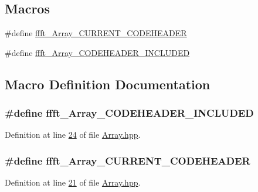 \subsection*{Macros}
\begin{DoxyCompactItemize}
\item 
\#define \hyperlink{a00084_a478c0a3d4e07d03940b1ced717db82e9}{ffft\+\_\+\+Array\+\_\+\+C\+U\+R\+R\+E\+N\+T\+\_\+\+C\+O\+D\+E\+H\+E\+A\+D\+E\+R}
\item 
\#define \hyperlink{a00084_a9c7eea905ae130cc9a5ee2a20ded5c21}{ffft\+\_\+\+Array\+\_\+\+C\+O\+D\+E\+H\+E\+A\+D\+E\+R\+\_\+\+I\+N\+C\+L\+U\+D\+E\+D}
\end{DoxyCompactItemize}


\subsection{Macro Definition Documentation}
\hypertarget{a00084_a9c7eea905ae130cc9a5ee2a20ded5c21}{
\subsubsection[{ffft\+\_\+\+Array\+\_\+\+C\+O\+D\+E\+H\+E\+A\+D\+E\+R\+\_\+\+I\+N\+C\+L\+U\+D\+E\+D}]{\setlength{\rightskip}{0pt plus 5cm}\#define ffft\+\_\+\+Array\+\_\+\+C\+O\+D\+E\+H\+E\+A\+D\+E\+R\+\_\+\+I\+N\+C\+L\+U\+D\+E\+D}}\label{a00084_a9c7eea905ae130cc9a5ee2a20ded5c21}


Definition at line \hyperlink{a00084_source_l00024}{24} of file \hyperlink{a00084_source}{Array.\+hpp}.

\hypertarget{a00084_a478c0a3d4e07d03940b1ced717db82e9}{
\subsubsection[{ffft\+\_\+\+Array\+\_\+\+C\+U\+R\+R\+E\+N\+T\+\_\+\+C\+O\+D\+E\+H\+E\+A\+D\+E\+R}]{\setlength{\rightskip}{0pt plus 5cm}\#define ffft\+\_\+\+Array\+\_\+\+C\+U\+R\+R\+E\+N\+T\+\_\+\+C\+O\+D\+E\+H\+E\+A\+D\+E\+R}}\label{a00084_a478c0a3d4e07d03940b1ced717db82e9}


Definition at line \hyperlink{a00084_source_l00021}{21} of file \hyperlink{a00084_source}{Array.\+hpp}.

